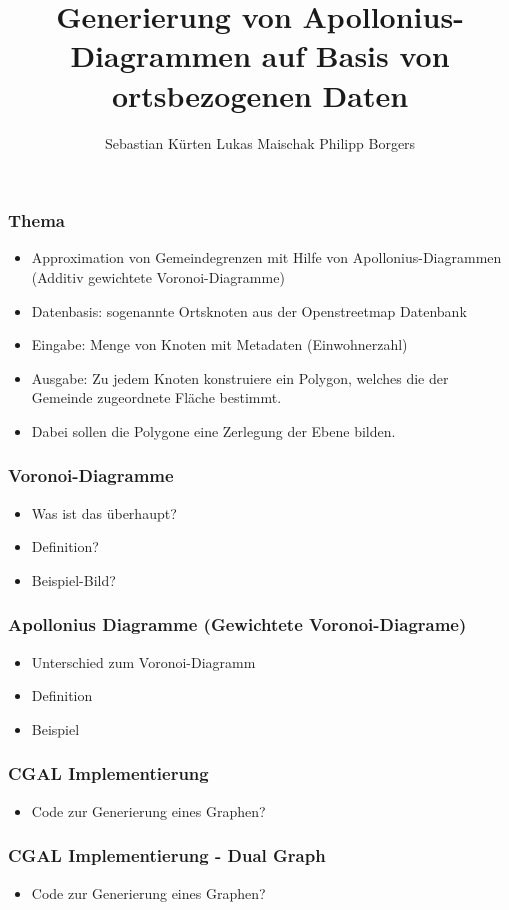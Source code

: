 \documentclass{beamer}
\title{Generierung von Apollonius-Diagrammen auf Basis von ortsbezogenen Daten}
\author[Sebastian Kürten, Philipp Borgers, Lukas Maischak]{
    Sebastian Kürten
    \newline Lukas Maischak
    \newline Philipp Borgers
}
\begin{document}
\begin{frame}
    \titlepage
\end{frame}

\begin{frame}
    \frametitle{Thema}
    \begin{itemize}
        \item Approximation von Gemeindegrenzen mit Hilfe von Apollonius-Diagrammen
        (Additiv gewichtete Voronoi-Diagramme)
        \item Datenbasis: sogenannte Ortsknoten aus der Openstreetmap Datenbank
        \item Eingabe: Menge von Knoten mit Metadaten (Einwohnerzahl)
        \item Ausgabe: Zu jedem Knoten konstruiere ein Polygon, welches die der Gemeinde
        zugeordnete Fläche bestimmt.
        \item Dabei sollen die Polygone eine Zerlegung der Ebene bilden.
    \end{itemize}
\end{frame}

\begin{frame}
    \frametitle{Voronoi-Diagramme}
    \begin{itemize}
        \item Was ist das überhaupt?
        \item Definition?
        \item Beispiel-Bild?
    \end{itemize}
\end{frame}

\begin{frame}
    \frametitle{Apollonius Diagramme (Gewichtete Voronoi-Diagrame)}
    \begin{itemize}
        \item Unterschied zum Voronoi-Diagramm
        \item Definition
        \item Beispiel
    \end{itemize}
\end{frame}

\begin{frame}
    \frametitle{CGAL Implementierung}
    \begin{itemize}
        \item Code zur Generierung eines Graphen?
    \end{itemize}
\end{frame}

\begin{frame}
    \frametitle{CGAL Implementierung - Dual Graph}
    \begin{itemize}
        \item Code zur Generierung eines Graphen?
    \end{itemize}
\end{frame}
\end{document}
